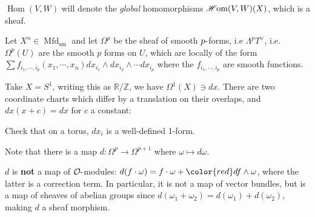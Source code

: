 \begin{warnings}

\({\operatorname{Hom}}(V, W)\) will denote the \emph{global}
homomorphisms \(\mathscr{H}\kern-2pt\operatorname{om}(V, W)(X)\), which
is a sheaf.

\end{warnings}

\begin{example}[?]

Let \(X^n \in {\operatorname{Mfd}}_{{\operatorname{sm}}}\) and let
\(\Omega^p\) be the sheaf of smooth \(p{\hbox{-}}\)forms, i.e
\(\Lambda^p T^\vee\), i.e.~\(\Omega^p(U)\) are the smooth \(p\) forms on
\(U\), which are locally of the form
\(\sum f_{i_1, \cdots, i_p} (x_1, \cdots, x_n) dx_{i_1} \wedge dx_{i_2} \wedge \cdots dx_{i_p}\)
where the \(f_{i_1, \cdots, i_p}\) are smooth functions.

\begin{example}

Take \(X= S^1\), writing this as \({\mathbb{R}}/{\mathbb{Z}}\), we have
\(\Omega^1(X) \ni dx\). There are two coordinate charts which differ by
a translation on their overlaps, and \(dx(x + c) =dx\) for \(c\) a
constant:

\begin{figure}
\centering
{}
\end{figure}

\end{example}

\begin{exercise}[?]

Check that on a torus, \(dx_i\) is a well-defined 1-form.

\end{exercise}

\end{example}

\begin{remark}

Note that there is a map \(d: \Omega^p \to \Omega^{p+1}\) where
\(\omega\mapsto d \omega\).

\end{remark}

\begin{warnings}

\(d\) is \textbf{not} a map of \({\mathcal{O}}{\hbox{-}}\)modules:
\(d(f\cdot \omega) = f\cdot \omega + {\color{red} df \wedge \omega}\),
where the latter is a correction term. In particular, it is not a map of
vector bundles, but is a map of sheaves of abelian groups since
\(d ( \omega_1 + \omega_2) = d( \omega_1 ) + d ( \omega_2)\), making
\(d\) a sheaf morphism.

\end{warnings}

